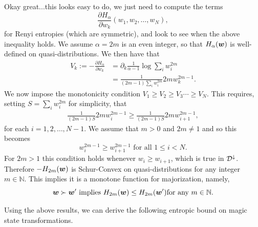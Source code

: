 \documentclass[pra,
aps,
twocolumn,
superscriptaddress,
groupedaddress,
nofootinbib,
reprint
]{revtex4-1}
\begin{document}
 Okay great...this looks easy to do, we just need to compute the terms
\begin{equation}
	\frac{\partial H_\alpha}{\partial w_k} (w_1, w_2, \dots, w_N),
\end{equation}
for Renyi entropies (which are symmetric), and look to see when the above inequality holds. 
We assume $ \alpha=2m$ is an even integer, so that $H_\alpha (\boldsymbol{w})$ is well-defined on quasi-distributions. We then have that
\begin{align}
V_k:=-\frac{\partial H_\alpha}{\partial w_k} &= \partial_k \frac{1}{\alpha-1} \log \sum_i w_i^{2m} \\
&= \frac{1}{(2m-1) \sum_i w_i^{2m}}2mw_k^{2m-1}.
\end{align}
We now impose the monotonicity condition $V_1 \ge V_2 \ge V_3 \cdots \ge V_N$. This requires, setting $S= \sum_i w_i^{2m}$ for simplicity, that
\begin{align}
 \frac{1}{(2m-1)S}2mw_i^{2m-1}\ge \frac{1}{(2m-1)S}2mw_{i+1}^{2m-1},
\end{align}
for each $i=1,2,\dots, N-1$. We assume that $m >0$ and $2m \ne 1$ and so this becomes
\begin{equation}
w_i^{2m-1}\ge w_{i+1}^{2m-1}\mbox{ for all } 1 \le i < N.
\end{equation}
For $2m >1$ this condition holds whenever $w_i \ge w_{i+1}$, which is true in ${\mathcal D}^\downarrow$. Therefore $-H_{2m}(\boldsymbol{w})$ is Schur-Convex on quasi-distributions for any integer $m\in \mathbb{N}$. This implies it is a monotone function for majorization, namely,
\begin{equation}
\boldsymbol{w} \succ \boldsymbol{w}' \mbox{ implies } H_{2m} (\boldsymbol{w}) \le H_{2m} (\boldsymbol{w}') \mbox{for any } m \in \mathbb{N}.
\end{equation}


Using the above results, we can derive the following entropic bound on magic state transformations. 
\end{document}
